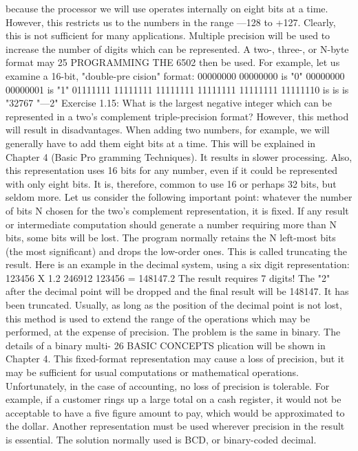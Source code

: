 because the processor we will use operates internally on eight bits
at a time. However, this restricts us to the numbers in the range
—128 to +127. Clearly, this is not sufficient for many applications.
Multiple precision will be used to increase the number of digits
which can be represented. A two-, three-, or N-byte format may
25
PROGRAMMING THE 6502
then be used. For example, let us examine a 16-bit, "double-pre
cision" format:
00000000 00000000 is "0"
00000000 00000001 is "1"
01111111
11111111
11111111
11111111
11111111
11111110
is
is
is
"32767
"—2"
Exercise 1.15: What is the largest negative integer which can be
represented in a two's complement triple-precision format?
However, this method will result in disadvantages. When adding
two numbers, for example, we will generally have to add them
eight bits at a time. This will be explained in Chapter 4 (Basic Pro
gramming Techniques). It results in slower processing. Also, this
representation uses 16 bits for any number, even if it could be
represented with only eight bits. It is, therefore, common to use 16
or perhaps 32 bits, but seldom more.
Let us consider the following important point: whatever the
number of bits N chosen for the two's complement representation,
it is fixed. If any result or intermediate computation should
generate a number requiring more than N bits, some bits will be
lost. The program normally retains the N left-most bits (the most
significant) and drops the low-order ones. This is called truncating
the result.
Here is an example in the decimal system, using a six digit
representation:
123456
X 1.2
246912
123456
= 148147.2
The result requires 7 digits! The "2" after the decimal point will be
dropped and the final result will be 148147. It has been truncated.
Usually, as long as the position of the decimal point is not lost, this
method is used to extend the range of the operations which may be
performed, at the expense of precision.
The problem is the same in binary. The details of a binary multi-
26
BASIC CONCEPTS
plication will be shown in Chapter 4.
This fixed-format representation may cause a loss of precision,
but it may be sufficient for usual computations or mathematical
operations.
Unfortunately, in the case of accounting, no loss of precision is
tolerable. For example, if a customer rings up a large total on a
cash register, it would not be acceptable to have a five figure
amount to pay, which would be approximated to the dollar.
Another representation must be used wherever precision in the
result is essential. The solution normally used is BCD, or
binary-coded decimal.
